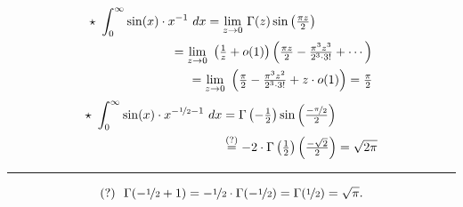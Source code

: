{      \vspace{-0.3cm}
      \begin{align*}
        \star \ \int_0^\infty \sin (x)\cdot x^{-1} \ dx &= \textstyle \underset{z \to 0}{\lim} \  \Gamma(z) \sin\left(\frac{\pi z}{2}\right) \\ 
        &\hspace{-1cm}= \textstyle \underset{z \to 0}{\lim} \ \left(\frac{1}{z} + o(1)\right) \left(\frac{\pi z}{2} - \frac{\pi^3z^3}{2^3 \cdot 3!} + \cdots \right) \\ 
        &\hspace{-0.5cm}= \textstyle \underset{z \to 0}{\lim} \ \left(\frac{\pi}{2} - \frac{\pi^3z^2}{2^3 \cdot 3!} + z\cdot o(1) \right) = \frac{\pi}{2}
      \end{align*}
      \vspace{-0.3cm}
      \begin{align*}
        \star \ \int_0^\infty \sin (x)\cdot x^{-\nicefrac{1}{2} - 1} \ dx &= \textstyle \Gamma\left(-\frac{1}{2}\right) \sin\left(\frac{-\nicefrac{\pi}{2}}{2}\right) \\ 
        &\overset{(?)}{=}\textstyle -2\cdot \Gamma\left(\frac{1}{2}\right) \left(\frac{-\sqrt{2}}{2}\right) = \sqrt{2\pi}  
      \end{align*}
      \hrule
      \vspace{-0.4cm}
      \[(?)\ \  \Gamma(-\nicefrac{1}{2} + 1) = -\nicefrac{1}{2} \cdot \Gamma(-\nicefrac{1}{2}) = \Gamma(\nicefrac{1}{2}) = \sqrt{\pi}.\] 
    }
